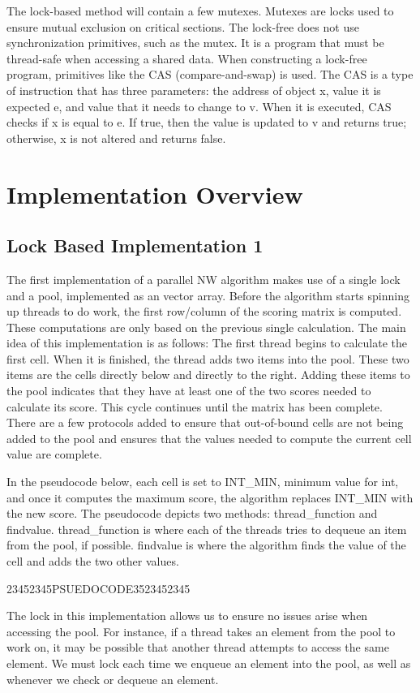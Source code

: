 \documentclass[letterpaper, 10 pt, conference]{IEEEconf}
\begin{document}
The lock-based method will contain a few mutexes. Mutexes are locks used to ensure mutual exclusion on critical sections. The lock-free does not use synchronization primitives, such as the mutex. It is a program that must be thread-safe when accessing a shared data. When constructing a lock-free program, primitives like the CAS (compare-and-swap) is used. The CAS is a type of instruction that has three parameters: the address of object x, value it is expected e, and value that it needs to change to v. When it is executed, CAS checks if x is equal to e. If true, then the value is updated to v and returns true; otherwise, x is not altered and returns false. 

\section{Implementation Overview}
\subsection{Lock Based Implementation 1}
The first implementation of a parallel NW algorithm makes use of a single lock and a pool, implemented as an vector array. Before the algorithm starts spinning up threads to do work, the first row/column of the scoring matrix is computed. These computations are only based on the previous single calculation. The main idea of this implementation is as follows: The first thread begins to calculate the first cell. When it is finished, the thread adds two items into the pool. These two items are the cells directly below and directly to the right. Adding these items to the pool indicates that they have at least one of the two scores needed to calculate its score. This cycle continues until the matrix has been complete. There are a few protocols added to ensure that out-of-bound cells are not being added to the pool and ensures that the values needed to compute the current cell value are complete. 

In the pseudocode below, each cell is set to INT_MIN, minimum value for int, and once it computes the maximum score, the algorithm replaces INT_MIN with the new score. The pseudocode depicts two methods: thread_function and findvalue. thread_function is where each of the threads tries to dequeue an item from the pool, if possible. findvalue is where the algorithm finds the value of the cell and adds the two other values. 

23452345PSUEDOCODE3523452345


The lock in this implementation allows us to ensure no issues arise when accessing the pool. For instance, if a thread takes an element from the pool to work on, it may be possible that another thread attempts to access the same element. We must lock each time we enqueue an element into the pool, as well as whenever we check or dequeue an element. 
\end{document}
